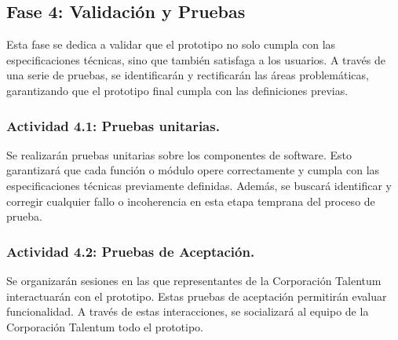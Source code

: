 \subsection{Fase 4: Validación y Pruebas}
Esta fase se dedica a validar que el prototipo no solo cumpla con las especificaciones técnicas, sino que también satisfaga a los usuarios. A través de una serie de pruebas, se identificarán y rectificarán las áreas problemáticas, garantizando que el prototipo final cumpla con las definiciones previas.

\subsubsection{Actividad 4.1: Pruebas unitarias.}
Se realizarán pruebas unitarias sobre los componentes de software. Esto garantizará que cada función o módulo opere correctamente y cumpla con las especificaciones técnicas previamente definidas. Además, se buscará identificar y corregir cualquier fallo o incoherencia en esta etapa temprana del proceso de prueba.

\subsubsection{Actividad 4.2: Pruebas de Aceptación.}
Se organizarán sesiones en las que representantes de la Corporación Talentum interactuarán con el prototipo. Estas pruebas de aceptación permitirán evaluar funcionalidad. A través de estas interacciones, se socializará al equipo de la Corporación Talentum todo el prototipo.










